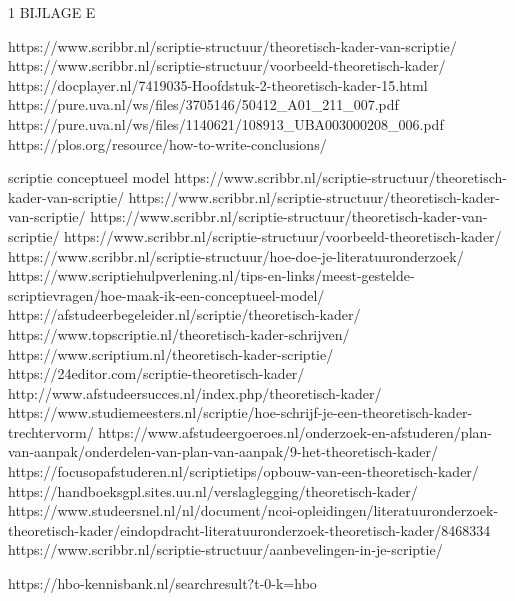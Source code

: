 1	BIJLAGE E


https://www.scribbr.nl/scriptie-structuur/theoretisch-kader-van-scriptie/
https://www.scribbr.nl/scriptie-structuur/voorbeeld-theoretisch-kader/
https://docplayer.nl/7419035-Hoofdstuk-2-theoretisch-kader-15.html
https://pure.uva.nl/ws/files/3705146/50412_A01_211_007.pdf
https://pure.uva.nl/ws/files/1140621/108913_UBA003000208_006.pdf
https://plos.org/resource/how-to-write-conclusions/













scriptie conceptueel model
https://www.scribbr.nl/scriptie-structuur/theoretisch-kader-van-scriptie/
https://www.scribbr.nl/scriptie-structuur/theoretisch-kader-van-scriptie/
https://www.scribbr.nl/scriptie-structuur/theoretisch-kader-van-scriptie/
https://www.scribbr.nl/scriptie-structuur/voorbeeld-theoretisch-kader/
https://www.scribbr.nl/scriptie-structuur/hoe-doe-je-literatuuronderzoek/
https://www.scriptiehulpverlening.nl/tips-en-links/meest-gestelde-scriptievragen/hoe-maak-ik-een-conceptueel-model/
https://afstudeerbegeleider.nl/scriptie/theoretisch-kader/
https://www.topscriptie.nl/theoretisch-kader-schrijven/
https://www.scriptium.nl/theoretisch-kader-scriptie/
https://24editor.com/scriptie-theoretisch-kader/
http://www.afstudeersucces.nl/index.php/theoretisch-kader/
https://www.studiemeesters.nl/scriptie/hoe-schrijf-je-een-theoretisch-kader-trechtervorm/
https://www.afstudeergoeroes.nl/onderzoek-en-afstuderen/plan-van-aanpak/onderdelen-van-plan-van-aanpak/9-het-theoretisch-kader/
https://focusopafstuderen.nl/scriptietips/opbouw-van-een-theoretisch-kader/
https://handboeksgpl.sites.uu.nl/verslaglegging/theoretisch-kader/
https://www.studeersnel.nl/nl/document/ncoi-opleidingen/literatuuronderzoek-theoretisch-kader/eindopdracht-literatuuronderzoek-theoretisch-kader/8468334
https://www.scribbr.nl/scriptie-structuur/aanbevelingen-in-je-scriptie/


https://hbo-kennisbank.nl/searchresult?t-0-k=hbo%

